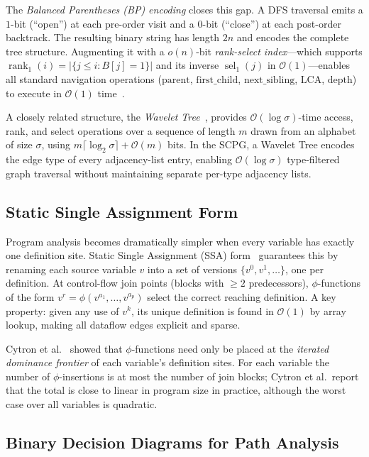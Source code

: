 \documentclass[journal,10pt,twoside]{IEEEtran}
\DeclareMathOperator{\rank}{rank}
\DeclareMathOperator{\sel}{sel}
\newcommand{\BigO}{\mathcal{O}}
\begin{document}
The \textit{Balanced Parentheses (BP) encoding} closes this
gap.  A DFS traversal emits a $1$-bit (``open'') at each
pre-order visit and a $0$-bit (``close'') at each
post-order backtrack.  The resulting binary string has length
$2n$ and encodes the complete tree structure.  Augmenting it
with a $o(n)$-bit \textit{rank-select index}---which supports
$\rank_1(i) = |\{j \le i : B[j]=1\}|$ and its inverse
$\sel_1(j)$ in $\BigO(1)$---enables all standard navigation
operations ($\mathrm{parent}$, $\mathrm{first\_child}$,
$\mathrm{next\_sibling}$, $\mathrm{LCA}$, $\mathrm{depth}$)
to execute in $\BigO(1)$ time~\cite{munroraman97,
sadakanenavarro14}.

A closely related structure, the \textit{Wavelet
Tree}~\cite{grossi03}, provides $\BigO(\log\sigma)$-time
access, rank, and select operations over a sequence of
length $m$ drawn from an alphabet of size $\sigma$, using
$m\lceil\log_2\sigma\rceil + \BigO(m)$ bits.  In the SCPG,
a Wavelet Tree encodes the edge type of every adjacency-list
entry, enabling $\BigO(\log\sigma)$ type-filtered graph
traversal without maintaining separate per-type adjacency
lists.

\subsection{Static Single Assignment Form}

Program analysis becomes dramatically simpler when every
variable has exactly one definition site.  Static Single
Assignment (SSA) form~\cite{cytron91} guarantees this by
renaming each source variable $v$ into a set of versions
$\{v^0, v^1, \ldots\}$, one per definition.  At control-flow
join points (blocks with $\ge 2$ predecessors), $\phi$-functions
of the form $v^r = \phi(v^{a_1},\ldots,v^{a_p})$ select the
correct reaching definition.  A key property: given any use
of $v^k$, its unique definition is found in $\BigO(1)$ by
array lookup, making all dataflow edges explicit and sparse.

Cytron et al.~\cite{cytron91} showed that $\phi$-functions
need only be placed at the \textit{iterated dominance frontier}
of each variable's definition sites.  For each variable the
number of $\phi$-insertions is at most the number of join
blocks; Cytron et al.\ report that the total is close to
linear in program size in practice, although the worst case
over all variables is quadratic.

\subsection{Binary Decision Diagrams for Path Analysis}
\end{document}

